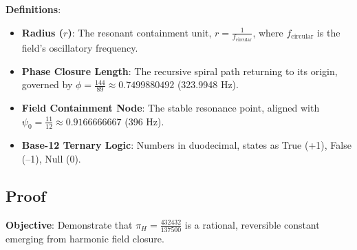 \documentclass[a4paper,12pt]{book}
\begin{document}
\textbf{Definitions}:
\begin{itemize}
    \item \textbf{Radius (\(r\))}: The resonant containment unit, \( r = \frac{1}{f_{\text{circular}}} \), where \( f_{\text{circular}} \) is the field's oscillatory frequency.
    \item \textbf{Phase Closure Length}: The recursive spiral path returning to its origin, governed by \(\phi = \frac{144}{89} \approx 0.7499880492\) (323.9948 Hz).
    \item \textbf{Field Containment Node}: The stable resonance point, aligned with \(\psi_0 = \frac{11}{12} \approx 0.9166666667\) (396 Hz).
    \item \textbf{Base-12 Ternary Logic}: Numbers in duodecimal, states as True (+1), False (–1), Null (0).
\end{itemize}

\subsection{Proof}
\textbf{Objective}: Demonstrate that \(\pi_H = \frac{432432}{137500}\) is a rational, reversible constant emerging from harmonic field closure.
\end{document}
